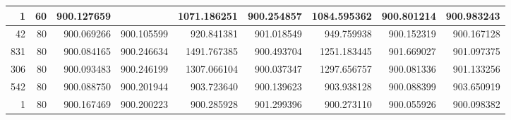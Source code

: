 \begin{table*}
\begin{tabular}{rrrrrrrrr}
     1        &    60  & 900.127659 &       & 1071.186251 & 900.254857 & 1084.595362 &  900.801214 & 900.983243 \\\midrule
    42       &     80 & 900.069266&  900.105599 &  920.841381  &901.018549 &  949.759938 & 900.152319 & 900.167128\\
    831      &      80 & 900.084165 & 900.246634 & 1491.767385 & 900.493704  &1251.183445 & 901.669027 &901.097375\\
    306     &       80 & 900.093483 & 900.246199 & 1307.066104 & 900.037347&  1297.656757 & 900.081336 & 901.133256\\
    542      &      80 & 900.088750&  900.201944 &  903.723640 & 900.139623 &  903.938128 & 900.088399 & 903.650919\\
    1        &    80&  900.167469 & 900.200223  & 900.285928 & 901.299396 &  900.273110 & 900.055926 & 900.098382\\
     \bottomrule
    \end{tabular}
\end{table*}
